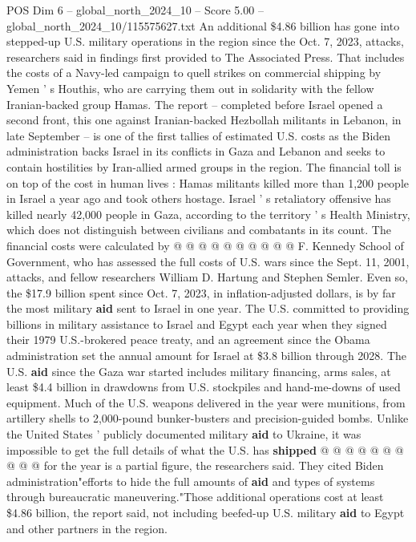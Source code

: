 \begin{textsample}{POS Dim 6 – global\_north\_2024\_10 – Score 5.00 – global\_north\_2024\_10/115575627.txt}  \label{ex:f6_pos_398}
An additional \$4.86 billion has gone into stepped-up U.S. military operations in the region since the Oct. 7, 2023, attacks, researchers said in findings first provided to The Associated Press.
That includes the costs of a Navy-led campaign to quell strikes on commercial shipping by Yemen ' s Houthis, who are carrying them out in solidarity with the fellow Iranian-backed group Hamas.
The report -- completed before Israel opened a second front, this one against Iranian-backed Hezbollah militants in Lebanon, in late September -- is one of the first tallies of estimated U.S. costs as the Biden administration backs Israel in its conflicts in Gaza and Lebanon and seeks to contain hostilities by Iran-allied armed groups in the region.
The financial toll is on top of the cost in human lives : Hamas militants killed more than 1,200 people in Israel a year ago and took others hostage.
Israel ' s retaliatory offensive has killed nearly 42,000 people in Gaza, according to the territory ' s Health Ministry, which does not distinguish between civilians and combatants in its count.
The financial costs were calculated by @ @ @ @ @ @ @ @ @ @ F.
Kennedy School of Government, who has assessed the full costs of U.S. wars since the Sept. 11, 2001, attacks, and fellow researchers William D.
Hartung and Stephen Semler.
Even so, the \$17.9 billion spent since Oct. 7, 2023, in inflation-adjusted dollars, is by far the most military \textbf{aid} sent to Israel in one year.
The U.S. committed to providing billions in military assistance to Israel and Egypt each year when they signed their 1979 U.S.-brokered peace treaty, and an agreement since the Obama administration set the annual amount for Israel at \$3.8 billion through 2028.
The U.S. \textbf{aid} since the Gaza war started includes military financing, arms sales, at least \$4.4 billion in drawdowns from U.S. stockpiles and hand-me-downs of used equipment.
Much of the U.S. weapons delivered in the year were munitions, from artillery shells to 2,000-pound bunker-busters and precision-guided bombs.
Unlike the United States ' publicly documented military \textbf{aid} to Ukraine, it was impossible to get the full details of what the U.S. has \textbf{shipped} @ @ @ @ @ @ @ @ @ @ for the year is a partial figure, the researchers said.
They cited Biden administration"efforts to hide the full amounts of \textbf{aid} and types of systems through bureaucratic maneuvering."Those additional operations cost at least \$4.86 billion, the report said, not including beefed-up U.S. military \textbf{aid} to Egypt and other partners in the region.

\end{textsample}
